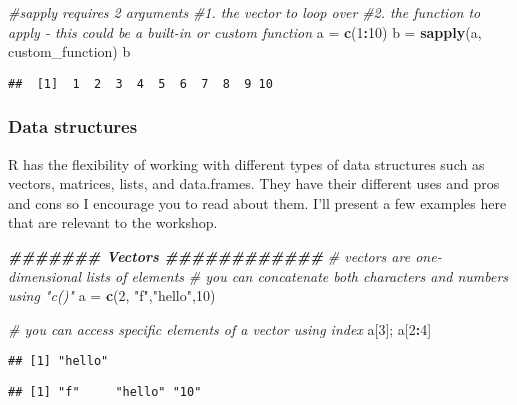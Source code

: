 \documentclass[
]{article}
\newenvironment{Shaded}{\begin{snugshade}}{\end{snugshade}}
\newcommand{\CommentTok}[1]{\textcolor[rgb]{0.56,0.35,0.01}{\textit{#1}}}
\newcommand{\DecValTok}[1]{\textcolor[rgb]{0.00,0.00,0.81}{#1}}
\newcommand{\DocumentationTok}[1]{\textcolor[rgb]{0.56,0.35,0.01}{\textbf{\textit{#1}}}}
\newcommand{\FunctionTok}[1]{\textcolor[rgb]{0.13,0.29,0.53}{\textbf{#1}}}
\newcommand{\NormalTok}[1]{#1}
\newcommand{\OtherTok}[1]{\textcolor[rgb]{0.56,0.35,0.01}{#1}}
\newcommand{\SpecialCharTok}[1]{\textcolor[rgb]{0.81,0.36,0.00}{\textbf{#1}}}
\newcommand{\StringTok}[1]{\textcolor[rgb]{0.31,0.60,0.02}{#1}}
\begin{document}
\begin{Shaded}
\begin{Highlighting}[]
\CommentTok{\#sapply requires 2 arguments}
\CommentTok{\#1. the vector to loop over}
\CommentTok{\#2. the function to apply {-} this could be a built{-}in or custom function}
\NormalTok{a }\OtherTok{=} \FunctionTok{c}\NormalTok{(}\DecValTok{1}\SpecialCharTok{:}\DecValTok{10}\NormalTok{)}
\NormalTok{b }\OtherTok{=} \FunctionTok{sapply}\NormalTok{(a, custom\_function)}
\NormalTok{b}
\end{Highlighting}
\end{Shaded}

\begin{verbatim}
##  [1]  1  2  3  4  5  6  7  8  9 10
\end{verbatim}

\hypertarget{data-structures}{%
\subsubsection{Data structures}\label{data-structures}}

R has the flexibility of working with different types of data structures
such as vectors, matrices, lists, and data.frames. They have their
different uses and pros and cons so I encourage you to read about them.
I'll present a few examples here that are relevant to the workshop.

\begin{Shaded}
\begin{Highlighting}[]
\DocumentationTok{\#\#\#\#\#\#\# Vectors \#\#\#\#\#\#\#\#\#\#\#\#}
\CommentTok{\# vectors are one{-}dimensional lists of elements}
\CommentTok{\# you can concatenate both characters and numbers using "c()"}
\NormalTok{a }\OtherTok{=} \FunctionTok{c}\NormalTok{(}\DecValTok{2}\NormalTok{, }\StringTok{"f"}\NormalTok{,}\StringTok{"hello"}\NormalTok{,}\DecValTok{10}\NormalTok{)}

\CommentTok{\# you can access specific elements of a vector using index}
\NormalTok{a[}\DecValTok{3}\NormalTok{]; a[}\DecValTok{2}\SpecialCharTok{:}\DecValTok{4}\NormalTok{]}
\end{Highlighting}
\end{Shaded}

\begin{verbatim}
## [1] "hello"
\end{verbatim}

\begin{verbatim}
## [1] "f"     "hello" "10"
\end{verbatim}
\end{document}
